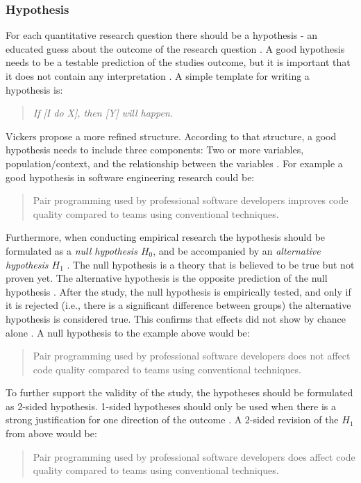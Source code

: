 
\subsubsection{Hypothesis}

For each quantitative research question there should be a hypothesis - an educated guess about the outcome of the research question \cite{Buddies2010,Farrugia2009}. A good hypothesis needs to be a testable prediction of the studies outcome, but it is important that it does not contain any interpretation \cite{Prasad2001}. A simple template for writing a hypothesis is:
\begin{quote}
	 \emph{If [I do X], then [Y] will happen.} \cite{Buddies2010}
\end{quote}
Vickers \etal propose a more refined structure. According to that structure, a good hypothesis needs to include three components: Two or more variables, population/context, and the relationship between the variables \cite{Vickers}. For example a good hypothesis in software engineering research could be: 
\begin{quote}
	Pair programming used by professional software developers improves code quality compared to teams using conventional techniques.
\end{quote}
Furthermore, when conducting empirical research the hypothesis should be formulated as a \emph{null hypothesis $H_0$}, and be accompanied by an \emph{alternative hypothesis $H_1$} \cite{Farrugia2009}. The null hypothesis is a theory that is believed to be true but not proven yet. The alternative hypothesis is the opposite prediction of the null hypothesis \cite{Prasad2001}. After the study, the null hypothesis is empirically tested, and only if it is rejected (i.e., there is a significant difference between groups) the alternative hypothesis is considered true. This confirms that effects did not show by chance alone \cite{Farrugia2009}. A null hypothesis to the example above would be:
\begin{quote}
	Pair programming used by professional software developers does not affect code quality compared to teams using conventional techniques.
\end{quote}
To further support the validity of the study, the hypotheses should be formulated as 2-sided hypothesis. \cite[p.280]{Farrugia2009} 1-sided hypotheses should only be used when there is a strong justification for one direction of the outcome \cite{Farrugia2009}. A 2-sided revision of the $H_1$ from above would be: 
\begin{quote}
	Pair programming used by professional software developers does affect code quality compared to teams using conventional techniques.
\end{quote}






